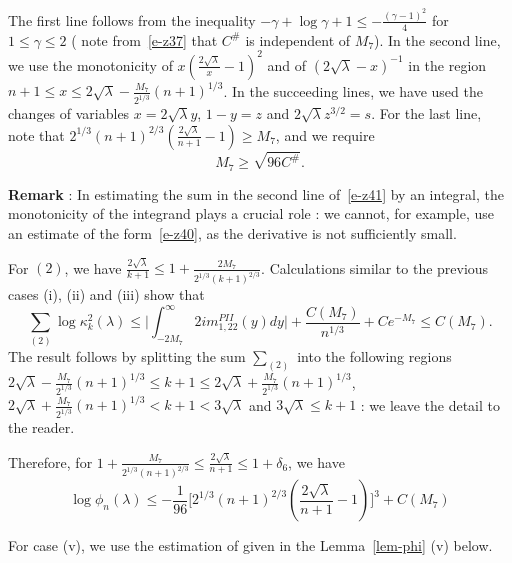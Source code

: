 \documentclass{amsart}
\theoremstyle{definition}
\theoremstyle{remark}
\numberwithin{equation}{section}
\begin{document}
The first line follows from the inequality 
$ -\gamma + \log \gamma +1 \leq -\frac{(\gamma-1)^2}{4}$ 
for $1\le \gamma \le 2$ ( note from~\eqref{e-z37} that $C^{\#}$ is independent of 
$M_7$).
In the second line, we use the monotonicity of 
$x(\frac{2\sqrt{\lambda}}{x}-1)^2$ and of $(2\sqrt{\lambda}-x)^{-1}$ 
in the region $n+1\le x\le 2\sqrt{\lambda}-\frac{M_7}{2^{1/3}}(n+1)^{1/3}$.
In the succeeding lines, we have used the changes of variables 
$x=2\sqrt{\lambda} y$, $1-y=z$ and $2\sqrt{\lambda} z^{3/2}=s$.
For the last line, note that $2^{1/3}(n+1)^{2/3}(\frac{2\sqrt\lambda}{n+1}-1)
\geq M_7$, and we require 
\begin{equation}\label{e-z39}
    M_7\geq \sqrt{96C^{\#}}.
\end{equation}

\textbf{Remark} : In estimating the sum in the second line of~\eqref{e-z41} 
by an integral, the monotonicity of the integrand plays a crucial role : 
we cannot, for example, use an estimate of the form~\eqref{e-z40}, as 
the derivative is not sufficiently small.


For $(2)$, we have 
$\frac{2\sqrt{\lambda}}{k+1} \le 1+\frac{2M_7}{2^{1/3}{(k+1)}^{2/3}}$.
Calculations similar to 
the previous cases (i), (ii) and (iii) show that 
\begin{equation*}
   \sum_{(2)} \log{\kappa^2_{k}(\lambda)} 
   \le  \bigl| \int_{-2M_7}^{\infty} 2im^{PII}_{1,22}(y) dy \bigr|
+ \frac{C(M_7)}{n^{1/3}}+Ce^{-M_7} \le C(M_7).
\end{equation*}
The result follows by splitting the sum $\sum_{(2)}$ into the following 
regions $2\sqrt{\lambda}-\frac{M_7}{2^{1/3}}(n+1)^{1/3}\le k+1 \le
2\sqrt{\lambda}+\frac{M_7}{2^{1/3}}(n+1)^{1/3}$, 
$2\sqrt{\lambda}+\frac{M_7}{2^{1/3}}(n+1)^{1/3} < k+1 <3\sqrt{\lambda}$ and 
$3\sqrt{\lambda} \le k+1$  : we leave the detail to the reader.

Therefore, for $1+\frac{M_7}{2^{1/3}{(n+1)}^{2/3}} \le 
\frac{2\sqrt{\lambda}}{n+1}
\le 1+\delta_6$, we have 
\begin{equation}
   \log \phi_n(\lambda) \le - \frac1{96}\biggl[2^{1/3}(n+1)^{2/3}
    (\frac{2\sqrt\lambda}{n+1}-1)\biggr]^3 + C(M_7) 
\end{equation}

\bigskip
For case (v), we use the estimation of \cite{Johan} given in the 
Lemma~\ref{lem-phi} (v) below.
\end{document}
